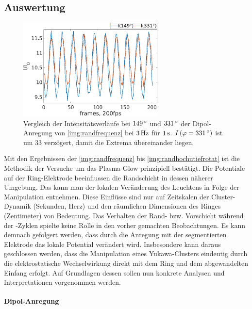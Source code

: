     \subsection{Auswertung}

        \begin{figure}[!b]
          \centering
          \hspace{-0.7cm}\includegraphics[width=0.65\textwidth,height=0.4\textwidth]{figs/auswertung/plasmaglw/intensdipol181u3313Hz1sek.png}
          \caption{Vergleich der Intensitätsverläufe bei $\unit[149]{\degree}$  und $\unit[331]{\degree}$ der Dipol-Anregung von \autoref{img:randfrequenz} bei $\unit[3]{Hz}$ für $\unit[1]{s}$. $I\left(\varphi=\unit[331]{\degree}\right)$ ist um 33  verzögert, damit die Extrema übereinander liegen.}
          \label{img:intensdipol}
        \end{figure}

      Mit den Ergebnissen der \autoref{img:randfrequenz} bis \autoref{img:randhochutiefrotat} ist die Methodik der Versuche um das Plasma-Glow prinzipiell bestätigt. Die Potentiale auf der Ring-Elektrode beeinflussen die Randschicht in dessen näherer Umgebung. Das kann man der lokalen Veränderung des Leuchtens in Folge der Manipulation entnehmen. Diese Einflüsse sind nur auf Zeitskalen der Cluster-Dynamik (Sekunden, Herz) und den räumlichen Dimensionen des Ringes (Zentimeter) von Bedeutung. Das Verhalten der Rand- bzw. Vorschicht während der -Zyklen spielte keine Rolle in den vorher gemachten Beobachtungen. Es kann demnach gefolgert werden, dass durch die Anregung mit der segmentierten Elektrode das lokale Potential verändert wird. Insbesondere kann daraus geschlossen werden, dass die Manipulation eines Yukawa-Clusters eindeutig durch die elektrostatische Wechselwirkung direkt mit dem Ring und dem abgewandelten Einfang erfolgt. Auf Grundlagen dessen sollen nun konkrete Analysen und Interpretationen vorgenommen werden.

      \paragraph{Dipol-Anregung}


